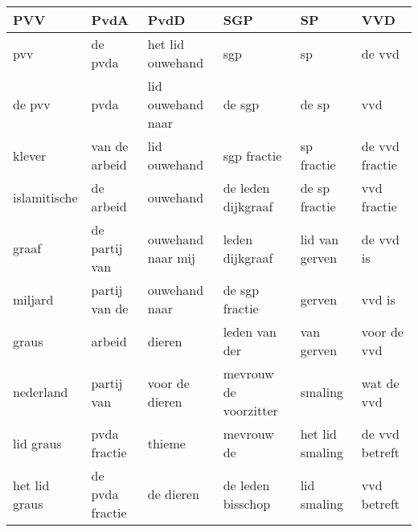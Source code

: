 \begin{tabular}{llllll}
\toprule
           PVV &             PvdA &               PvdD &                    SGP &               SP &             VVD \\
\midrule
           pvv &          de pvda &   het lid ouwehand &                    sgp &               sp &          de vvd \\
        de pvv &             pvda &  lid ouwehand naar &                 de sgp &            de sp &             vvd \\
        klever &    van de arbeid &       lid ouwehand &            sgp fractie &       sp fractie &  de vvd fractie \\
  islamitische &        de arbeid &           ouwehand &     de leden dijkgraaf &    de sp fractie &     vvd fractie \\
         graaf &    de partij van &  ouwehand naar mij &        leden dijkgraaf &   lid van gerven &       de vvd is \\
       miljard &    partij van de &      ouwehand naar &         de sgp fractie &           gerven &          vvd is \\
         graus &           arbeid &             dieren &          leden van der &       van gerven &     voor de vvd \\
     nederland &       partij van &     voor de dieren &  mevrouw de voorzitter &          smaling &      wat de vvd \\
     lid graus &     pvda fractie &             thieme &             mevrouw de &  het lid smaling &  de vvd betreft \\
 het lid graus &  de pvda fractie &          de dieren &      de leden bisschop &      lid smaling &     vvd betreft \\
\bottomrule
\end{tabular}
